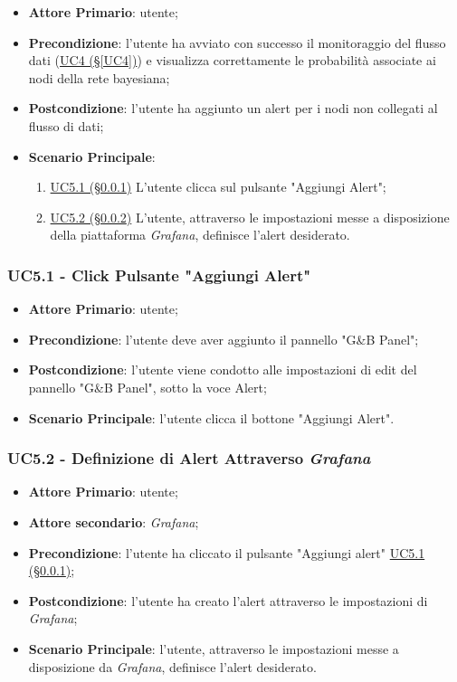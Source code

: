 \begin{itemize}
	\item \textbf{Attore Primario}: utente;
	\item \textbf{Precondizione}:
	l'utente ha avviato con successo il monitoraggio del flusso dati (\hyperref[UC4]				{UC4 (§\ref*{UC4})}) e visualizza correttamente le probabilità associate ai nodi della rete bayesiana;
	\item \textbf{Postcondizione}: l'utente ha aggiunto un alert per i nodi non collegati al flusso di dati;
	\item \textbf{Scenario Principale}:
	\begin{enumerate}
		\item \hyperref[UC5.1]{UC5.1 (§\ref*{UC5.1})}  L'utente clicca sul pulsante "Aggiungi Alert";
		\item \hyperref[UC5.2]{UC5.2 (§\ref*{UC5.2})} L'utente, attraverso le impostazioni messe a disposizione della piattaforma \textit{Grafana}, definisce l'alert desiderato.
	\end{enumerate}
	
\end{itemize}

\subsubsection{UC5.1 - Click Pulsante "Aggiungi Alert"}\label{UC5.1}
\begin{itemize}
	\item \textbf{Attore Primario}: utente;
	\item \textbf{Precondizione}: l'utente deve aver aggiunto il pannello "G\&B Panel";
	\item \textbf{Postcondizione}: l'utente viene condotto alle impostazioni di edit del pannello 
	"G\&B Panel", sotto la voce Alert;
	\item \textbf{Scenario Principale}: l'utente clicca il bottone "Aggiungi Alert".
\end{itemize}

\subsubsection{UC5.2 - Definizione di Alert Attraverso \textit{Grafana}}\label{UC5.2}
\begin{itemize}
	\item \textbf{Attore Primario}: utente;
	\item \textbf{Attore secondario}: \textit{Grafana};
	\item \textbf{Precondizione}: l'utente ha cliccato il pulsante "Aggiungi alert" \hyperref[UC5.1]{UC5.1 (§\ref*{UC5.1})};
	\item \textbf{Postcondizione}: l'utente ha creato l'alert attraverso le impostazioni di \textit{Grafana};
	\item \textbf{Scenario Principale}: l'utente, attraverso le impostazioni messe a disposizione da \textit{Grafana}, definisce l'alert desiderato.
\end{itemize}

